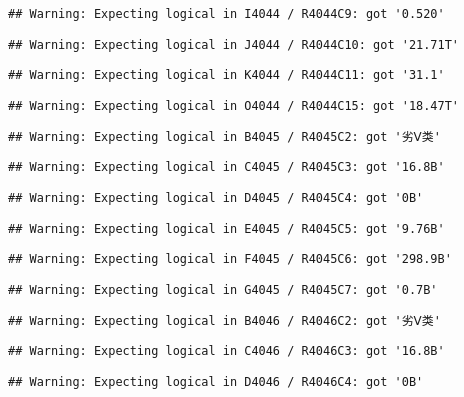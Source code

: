\documentclass[
]{article}
\begin{document}
\begin{verbatim}
## Warning: Expecting logical in I4044 / R4044C9: got '0.520'
\end{verbatim}

\begin{verbatim}
## Warning: Expecting logical in J4044 / R4044C10: got '21.71T'
\end{verbatim}

\begin{verbatim}
## Warning: Expecting logical in K4044 / R4044C11: got '31.1'
\end{verbatim}

\begin{verbatim}
## Warning: Expecting logical in O4044 / R4044C15: got '18.47T'
\end{verbatim}

\begin{verbatim}
## Warning: Expecting logical in B4045 / R4045C2: got '劣Ⅴ类'
\end{verbatim}

\begin{verbatim}
## Warning: Expecting logical in C4045 / R4045C3: got '16.8B'
\end{verbatim}

\begin{verbatim}
## Warning: Expecting logical in D4045 / R4045C4: got '0B'
\end{verbatim}

\begin{verbatim}
## Warning: Expecting logical in E4045 / R4045C5: got '9.76B'
\end{verbatim}

\begin{verbatim}
## Warning: Expecting logical in F4045 / R4045C6: got '298.9B'
\end{verbatim}

\begin{verbatim}
## Warning: Expecting logical in G4045 / R4045C7: got '0.7B'
\end{verbatim}

\begin{verbatim}
## Warning: Expecting logical in B4046 / R4046C2: got '劣Ⅴ类'
\end{verbatim}

\begin{verbatim}
## Warning: Expecting logical in C4046 / R4046C3: got '16.8B'
\end{verbatim}

\begin{verbatim}
## Warning: Expecting logical in D4046 / R4046C4: got '0B'
\end{verbatim}
\end{document}
